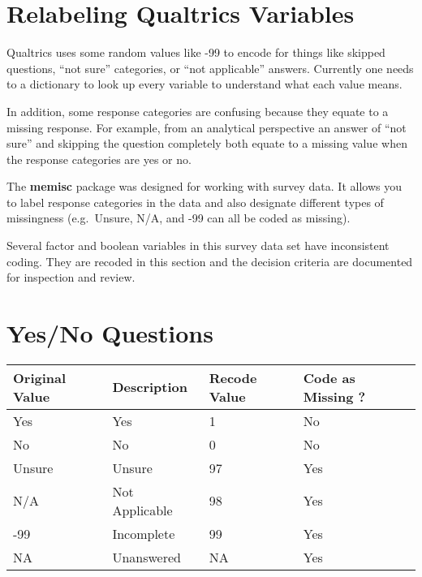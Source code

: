 \documentclass[
  letterpaper,
]{scrbook}
\begin{document}
\chapter{Relabeling Qualtrics
Variables}\label{relabeling-qualtrics-variables}

Qualtrics uses some random values like -99 to encode for things like
skipped questions, ``not sure'' categories, or ``not applicable''
answers. Currently one needs to a dictionary to look up every variable
to understand what each value means.

In addition, some response categories are confusing because they equate
to a missing response. For example, from an analytical perspective an
answer of ``not sure'' and skipping the question completely both equate
to a missing value when the response categories are yes or no.

The \textbf{memisc} package was designed for working with survey data.
It allows you to label response categories in the data and also
designate different types of missingness (e.g.~Unsure, N/A, and -99 can
all be coded as missing).

Several factor and boolean variables in this survey data set have
inconsistent coding. They are recoded in this section and the decision
criteria are documented for inspection and review.

\chapter{Yes/No Questions}\label{yesno-questions}

\begin{longtable}[]{@{}llll@{}}
\toprule\noalign{}
Original Value & Description & Recode Value & Code as Missing ? \\
\midrule\noalign{}
\endhead
\bottomrule\noalign{}
\endlastfoot
Yes & Yes & 1 & No \\
No & No & 0 & No \\
Unsure & Unsure & 97 & Yes \\
N/A & Not Applicable & 98 & Yes \\
-99 & Incomplete & 99 & Yes \\
NA & Unanswered & NA & Yes \\
\end{longtable}
\end{document}
